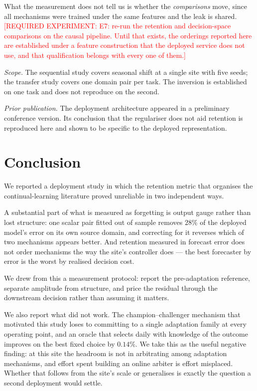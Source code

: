 \documentclass[journal]{IEEEtran}
\newcommand{\needexp}[1]{\textcolor{red}{[REQUIRED EXPERIMENT: #1]}}
\begin{document}
What the measurement does not tell us is whether the \emph{comparisons} move,
since all mechanisms were trained under the same features and the leak is
shared. \needexp{E7: re-run the retention and decision-space comparisons on the
causal pipeline. Until that exists, the orderings reported here are established
under a feature construction that the deployed service does not use, and that
qualification belongs with every one of them.}

\emph{Scope.} The sequential study covers seasonal shift at a single site with
five seeds; the transfer study covers one domain pair per task. The inversion is
established on one task and does not reproduce on the second.

\emph{Prior publication.} The deployment architecture appeared in a preliminary
conference version. Its conclusion that the regulariser does not aid retention
is reproduced here and shown to be specific to the deployed representation.

\section{Conclusion}
\label{sec:conclusion}

We reported a deployment study in which the retention metric that organises the
continual-learning literature proved unreliable in two independent ways.

A substantial part of what is measured as forgetting is output gauge rather
than lost structure: one scalar pair fitted out of sample removes $28\%$ of the
deployed model's error on its own source domain, and correcting for it reverses
which of two mechanisms appears better. And retention measured in forecast
error does not order mechanisms the way the site's controller does --- the best
forecaster by error is the worst by realised decision cost.

We drew from this a measurement protocol: report the pre-adaptation reference,
separate amplitude from structure, and price the residual through the
downstream decision rather than assuming it matters.

We also report what did not work. The champion--challenger mechanism that
motivated this study loses to committing to a single adaptation family at every
operating point, and an oracle that selects daily with knowledge of the outcome
improves on the best fixed choice by $0.14\%$. We take this as the useful
negative finding: at this site the headroom is not in arbitrating among
adaptation mechanisms, and effort spent building an online arbiter is effort
misplaced. Whether that follows from the site's scale or generalises is exactly
the question a second deployment would settle.



\end{document}
